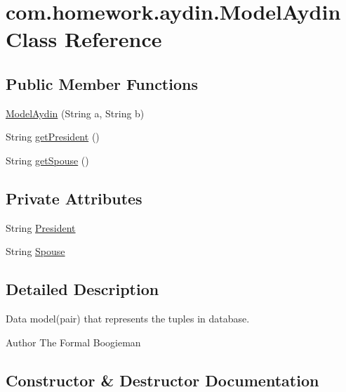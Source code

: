 \hypertarget{classcom_1_1homework_1_1aydin_1_1_model_aydin}{}\section{com.\+homework.\+aydin.\+Model\+Aydin Class Reference}
\label{classcom_1_1homework_1_1aydin_1_1_model_aydin}
\subsection*{Public Member Functions}
\begin{DoxyCompactItemize}
\item 
\hyperlink{classcom_1_1homework_1_1aydin_1_1_model_aydin_a2b5b3180f1ed08937aaf5026595dfb21}{Model\+Aydin} (String a, String b)
\item 
String \hyperlink{classcom_1_1homework_1_1aydin_1_1_model_aydin_a78ae4a08eb53098af8fdcd19254b9b73}{get\+President} ()
\item 
String \hyperlink{classcom_1_1homework_1_1aydin_1_1_model_aydin_a89f55c4739542a91eb3e7eedbbdc0270}{get\+Spouse} ()
\end{DoxyCompactItemize}
\subsection*{Private Attributes}
\begin{DoxyCompactItemize}
\item 
String \hyperlink{classcom_1_1homework_1_1aydin_1_1_model_aydin_af742c233f87d59f308d1fb1dc08922c2}{President}
\item 
String \hyperlink{classcom_1_1homework_1_1aydin_1_1_model_aydin_a0583b3beb1421203f08c5f10e6c5e5e3}{Spouse}
\end{DoxyCompactItemize}


\subsection{Detailed Description}
Data model(pair) that represents the tuples in database. \begin{DoxyAuthor}{Author}
The Formal Boogieman 
\end{DoxyAuthor}


\subsection{Constructor \& Destructor Documentation}

